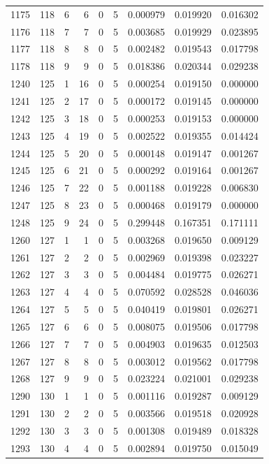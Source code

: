 \begin{longtable}{rrrrrrrrr}
1175 & 118 & 6 & 6 & 0 & 5 & 0.000979 & 0.019920 & 0.016302 \\
1176 & 118 & 7 & 7 & 0 & 5 & 0.003685 & 0.019929 & 0.023895 \\
1177 & 118 & 8 & 8 & 0 & 5 & 0.002482 & 0.019543 & 0.017798 \\
1178 & 118 & 9 & 9 & 0 & 5 & 0.018386 & 0.020344 & 0.029238 \\
1240 & 125 & 1 & 16 & 0 & 5 & 0.000254 & 0.019150 & 0.000000 \\
1241 & 125 & 2 & 17 & 0 & 5 & 0.000172 & 0.019145 & 0.000000 \\
1242 & 125 & 3 & 18 & 0 & 5 & 0.000253 & 0.019153 & 0.000000 \\
1243 & 125 & 4 & 19 & 0 & 5 & 0.002522 & 0.019355 & 0.014424 \\
1244 & 125 & 5 & 20 & 0 & 5 & 0.000148 & 0.019147 & 0.001267 \\
1245 & 125 & 6 & 21 & 0 & 5 & 0.000292 & 0.019164 & 0.001267 \\
1246 & 125 & 7 & 22 & 0 & 5 & 0.001188 & 0.019228 & 0.006830 \\
1247 & 125 & 8 & 23 & 0 & 5 & 0.000468 & 0.019179 & 0.000000 \\
1248 & 125 & 9 & 24 & 0 & 5 & 0.299448 & 0.167351 & 0.171111 \\
1260 & 127 & 1 & 1 & 0 & 5 & 0.003268 & 0.019650 & 0.009129 \\
1261 & 127 & 2 & 2 & 0 & 5 & 0.002969 & 0.019398 & 0.023227 \\
1262 & 127 & 3 & 3 & 0 & 5 & 0.004484 & 0.019775 & 0.026271 \\
1263 & 127 & 4 & 4 & 0 & 5 & 0.070592 & 0.028528 & 0.046036 \\
1264 & 127 & 5 & 5 & 0 & 5 & 0.040419 & 0.019801 & 0.026271 \\
1265 & 127 & 6 & 6 & 0 & 5 & 0.008075 & 0.019506 & 0.017798 \\
1266 & 127 & 7 & 7 & 0 & 5 & 0.004903 & 0.019635 & 0.012503 \\
1267 & 127 & 8 & 8 & 0 & 5 & 0.003012 & 0.019562 & 0.017798 \\
1268 & 127 & 9 & 9 & 0 & 5 & 0.023224 & 0.021001 & 0.029238 \\
1290 & 130 & 1 & 1 & 0 & 5 & 0.001116 & 0.019287 & 0.009129 \\
1291 & 130 & 2 & 2 & 0 & 5 & 0.003566 & 0.019518 & 0.020928 \\
1292 & 130 & 3 & 3 & 0 & 5 & 0.001308 & 0.019489 & 0.018328 \\
1293 & 130 & 4 & 4 & 0 & 5 & 0.002894 & 0.019750 & 0.015049 \\

\end{longtable}

